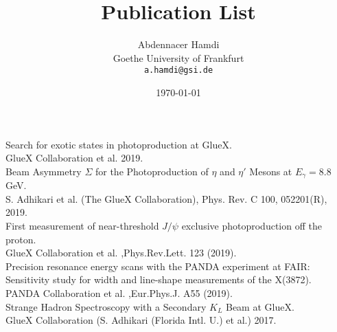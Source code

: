\documentclass[a4paper,roman]{article}
\title{Publication List}
\author{Abdennacer Hamdi\\
Goethe University of Frankfurt\\
\texttt{a.hamdi@gsi.de}}
\date{\today}
\begin{document}
\fontsize{12}{15}
\selectfont
\maketitle

\begin{thebibliography}{ABC}
    	
     Search for exotic states in photoproduction at GlueX.\\
    GlueX Collaboration et al. 2019.\\
     Beam Asymmetry $\Sigma$ for the Photoproduction of $\eta$ and $\eta'$ Mesons at $E_\gamma=8.8$ GeV.\\
    S. Adhikari et al. (The GlueX Collaboration), Phys. Rev. C 100, 052201(R), 2019.\\
     First measurement of near-threshold $J/\psi$ exclusive photoproduction off the proton.\\
    GlueX Collaboration et al. ,Phys.Rev.Lett. 123 (2019).\\
     Precision resonance energy scans with the PANDA experiment at FAIR: Sensitivity study for width and line-shape measurements of the X(3872).\\ 
    PANDA Collaboration et al. ,Eur.Phys.J. A55 (2019).\\
     Strange Hadron Spectroscopy with a Secondary $K_{L}$ Beam at GlueX.\\ 
    GlueX Collaboration (S. Adhikari (Florida Intl. U.) et al.) 2017.\\

\end{thebibliography}
\end{document}
